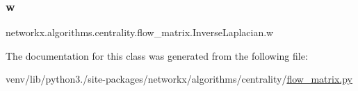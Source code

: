 \subsubsection{\texorpdfstring{w}{w}}
{\footnotesize\ttfamily networkx.\+algorithms.\+centrality.\+flow\+\_\+matrix.\+Inverse\+Laplacian.\+w}



The documentation for this class was generated from the following file\+:\begin{DoxyCompactItemize}
\item 
venv/lib/python3./site-\/packages/networkx/algorithms/centrality/\hyperlink{flow__matrix_8py}{flow\+\_\+matrix.\+py}\end{DoxyCompactItemize}

